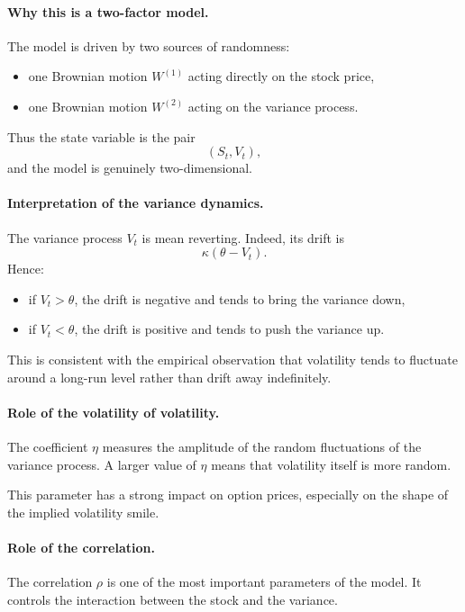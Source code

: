 \documentclass[11pt]{article}
\theoremstyle{plain}
\theoremstyle{definition}
\theoremstyle{remark}
\begin{document}
\paragraph{Why this is a two-factor model.}
The model is driven by two sources of randomness:
\begin{itemize}[leftmargin=1.4em]
    \item one Brownian motion \(W^{(1)}\) acting directly on the stock price,
    \item one Brownian motion \(W^{(2)}\) acting on the variance process.
\end{itemize}
Thus the state variable is the pair
\[
(S_t,V_t),
\]
and the model is genuinely two-dimensional.

\paragraph{Interpretation of the variance dynamics.}
The variance process \(V_t\) is mean reverting.
Indeed, its drift is
\[
\kappa(\theta-V_t).
\]
Hence:
\begin{itemize}[leftmargin=1.4em]
    \item if \(V_t>\theta\), the drift is negative and tends to bring the variance down,
    \item if \(V_t<\theta\), the drift is positive and tends to push the variance up.
\end{itemize}

This is consistent with the empirical observation that volatility tends
to fluctuate around a long-run level rather than drift away indefinitely.

\paragraph{Role of the volatility of volatility.}
The coefficient \(\eta\) measures the amplitude of the random
fluctuations of the variance process.
A larger value of \(\eta\) means that volatility itself is more random.

This parameter has a strong impact on option prices, especially on the
shape of the implied volatility smile.

\paragraph{Role of the correlation.}
The correlation \(\rho\) is one of the most important parameters of the
model.
It controls the interaction between the stock and the variance.
\end{document}
